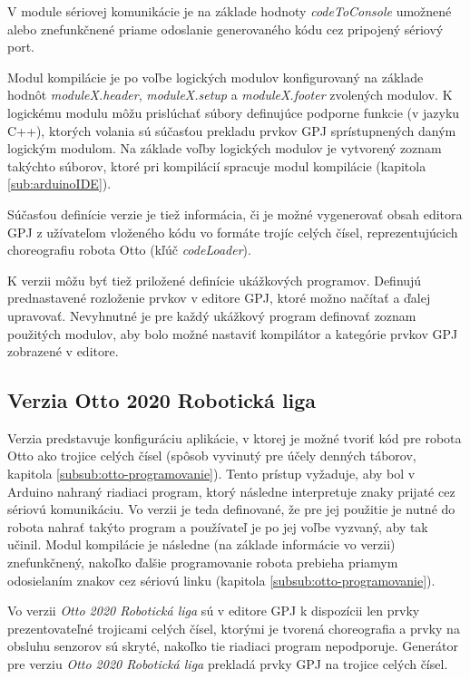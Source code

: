 V module sériovej komunikácie je na základe hodnoty \textit{codeToConsole} umožnené alebo znefunkčnené priame odoslanie generovaného kódu cez pripojený sériový port.

Modul kompilácie je po voľbe logických modulov konfigurovaný na základe hodnôt \textit{moduleX.header}, \textit{moduleX.setup} a \textit{moduleX.footer} zvolených modulov. K logickému modulu môžu prislúchať súbory definujúce podporne funkcie (v jazyku C++), ktorých volania sú súčasťou prekladu prvkov GPJ sprístupnených daným logickým modulom. Na základe voľby logických modulov je vytvorený zoznam takýchto súborov, ktoré pri kompilácií spracuje modul kompilácie (kapitola \ref{sub:arduinoIDE}).

Súčasťou definície verzie je tiež informácia, či je možné vygenerovať obsah editora GPJ z užívateľom vloženého kódu vo formáte trojíc celých čísel, reprezentujúcich choreografiu robota Otto (kľúč \textit{codeLoader}).

K verzii môžu byť tiež priložené definície ukážkových programov. Definujú prednastavené rozloženie prvkov v editore GPJ, ktoré možno načítať a ďalej upravovať. Nevyhnutné je pre každý ukážkový program definovať zoznam použitých modulov, aby bolo možné nastaviť kompilátor a kategórie prvkov GPJ zobrazené v editore.

\subsection{Verzia Otto 2020 Robotická liga}
Verzia predstavuje konfiguráciu aplikácie, v ktorej je možné tvoriť kód pre robota Otto ako trojice celých čísel (spôsob vyvinutý pre účely denných táborov, kapitola \ref{subsub:otto-programovanie}). Tento prístup vyžaduje, aby bol v Arduino nahraný  riadiaci program, ktorý následne interpretuje znaky prijaté cez sériovú komunikáciu. Vo verzii je teda definované, že pre jej použitie je nutné do robota nahrať takýto program a používateľ je po jej voľbe vyzvaný, aby tak učinil. Modul kompilácie je následne (na základe informácie vo verzii) znefunkčnený, nakoľko ďalšie programovanie robota prebieha priamym odosielaním znakov cez sériovú linku (kapitola \ref{subsub:otto-programovanie}).

Vo verzii \textit{Otto 2020 Robotická liga} sú v editore GPJ k dispozícii len prvky prezentovateľné trojicami celých čísel, ktorými je tvorená choreografia a prvky na obsluhu senzorov sú skryté, nakoľko tie riadiaci program nepodporuje. Generátor pre verziu \textit{Otto 2020 Robotická liga} prekladá prvky GPJ na trojice celých čísel.

